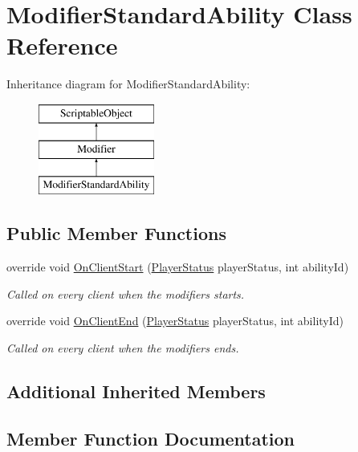 \hypertarget{class_modifier_standard_ability}{}\section{Modifier\+Standard\+Ability Class Reference}
\label{class_modifier_standard_ability}
Inheritance diagram for Modifier\+Standard\+Ability\+:\begin{figure}[H]
\begin{center}
\leavevmode
\includegraphics[height=3.000000cm]{class_modifier_standard_ability}
\end{center}
\end{figure}
\subsection*{Public Member Functions}
\begin{DoxyCompactItemize}
\item 
override void \hyperlink{class_modifier_standard_ability_a92fa22504144748d8f3fc6df932da9c1}{On\+Client\+Start} (\hyperlink{class_player_status}{Player\+Status} player\+Status, int ability\+Id)
\begin{DoxyCompactList}\small\item\em Called on every client when the modifiers starts. \end{DoxyCompactList}\item 
override void \hyperlink{class_modifier_standard_ability_a46000f6d2262a1436d1826774d7a0f59}{On\+Client\+End} (\hyperlink{class_player_status}{Player\+Status} player\+Status, int ability\+Id)
\begin{DoxyCompactList}\small\item\em Called on every client when the modifiers ends. \end{DoxyCompactList}\end{DoxyCompactItemize}
\subsection*{Additional Inherited Members}


\subsection{Member Function Documentation}
\hypertarget{class_modifier_standard_ability_a46000f6d2262a1436d1826774d7a0f59}{}\label{class_modifier_standard_ability_a46000f6d2262a1436d1826774d7a0f59} 
